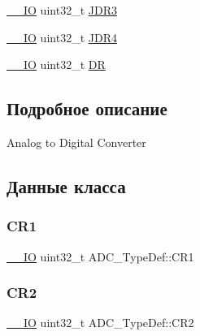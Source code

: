 \begin{DoxyCompactItemize}
\item 
\mbox{\hyperlink{group___c_m_s_i_s___c_m3__core__definitions_gaec43007d9998a0a0e01faede4133d6be}{\+\_\+\+\_\+\+IO}} uint32\+\_\+t \mbox{\hyperlink{struct_a_d_c___type_def_a40999cd0a255ef62b2340e2726695063}{J\+D\+R3}}
\item 
\mbox{\hyperlink{group___c_m_s_i_s___c_m3__core__definitions_gaec43007d9998a0a0e01faede4133d6be}{\+\_\+\+\_\+\+IO}} uint32\+\_\+t \mbox{\hyperlink{struct_a_d_c___type_def_abae6e9d688b16ef350878998f5e21c0b}{J\+D\+R4}}
\item 
\mbox{\hyperlink{group___c_m_s_i_s___c_m3__core__definitions_gaec43007d9998a0a0e01faede4133d6be}{\+\_\+\+\_\+\+IO}} uint32\+\_\+t \mbox{\hyperlink{struct_a_d_c___type_def_a84114accead82bd11a0e12a429cdfed9}{DR}}
\end{DoxyCompactItemize}


\subsection{Подробное описание}
Analog to Digital Converter ~\newline
 

\subsection{Данные класса}
\mbox{\label{struct_a_d_c___type_def_a89b1ff4376683dd2896ea8b32ded05b2}} 
\subsubsection{\texorpdfstring{CR1}{CR1}}
{\footnotesize\ttfamily \mbox{\hyperlink{group___c_m_s_i_s___c_m3__core__definitions_gaec43007d9998a0a0e01faede4133d6be}{\+\_\+\+\_\+\+IO}} uint32\+\_\+t A\+D\+C\+\_\+\+Type\+Def\+::\+C\+R1}

\mbox{\label{struct_a_d_c___type_def_a1053a65a21af0d27afe1bf9cf7b7aca7}} 
\subsubsection{\texorpdfstring{CR2}{CR2}}
{\footnotesize\ttfamily \mbox{\hyperlink{group___c_m_s_i_s___c_m3__core__definitions_gaec43007d9998a0a0e01faede4133d6be}{\+\_\+\+\_\+\+IO}} uint32\+\_\+t A\+D\+C\+\_\+\+Type\+Def\+::\+C\+R2}

